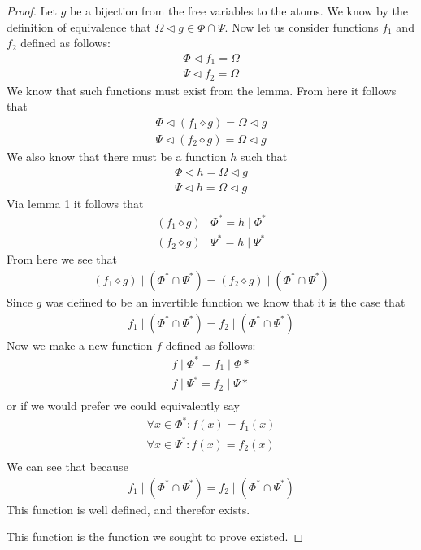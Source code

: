 \documentclass{article}
\begin{document}
\begin{proof}
Let $g$ be a bijection from the free variables to the atoms.
We know by the definition of equivalence that $\Omega \lhd g \in \Phi \cap \Psi$.
Now let us consider functions $f_1$ and $f_2$ defined as follows:
\begin{align*}
\Phi \lhd f_1 = \Omega \\
\Psi \lhd f_2 = \Omega
\end{align*}
We know that such functions must exist from the lemma.
From here it follows that
\begin{align*}
\Phi \lhd (f_1 \diamond g) = \Omega \lhd g \\
\Psi \lhd (f_2 \diamond g) = \Omega \lhd g
\end{align*}
We also know that there must be a function $h$ such that
\begin{align*}
\Phi \lhd h = \Omega \lhd g \\
\Psi \lhd h = \Omega \lhd g
\end{align*}
Via lemma 1 it follows that
\begin{align*}
(f_1 \diamond g) \mid \Phi^* = h \mid \Phi^* \\
(f_2 \diamond g) \mid \Psi^* = h \mid \Psi^*
\end{align*}
From here we see that
\begin{align*}
(f_1 \diamond g) \mid (\Phi^* \cap \Psi^*) = (f_2 \diamond g) \mid (\Phi^* \cap \Psi^*)
\end{align*}
Since $g$ was defined to be an invertible function we know that it is the case that
\begin{align*}
f_1 \mid (\Phi^* \cap \Psi^*) = f_2 \mid (\Phi^* \cap \Psi^*)
\end{align*}
Now we make a new function $f$ defined as follows:
\begin{align*}
f \mid \Phi^* = f_1 \mid \Phi* \\
f \mid \Psi^* = f_2 \mid \Psi* \\
\end{align*}
or if we would prefer we could equivalently say
\begin{align*}
\forall x \in \Phi^* : f (x) = f_1 (x) \\
\forall x \in \Psi^* : f (x) = f_2 (x) \\
\end{align*}
We can see that because
\begin{align*}
f_1 \mid (\Phi^* \cap \Psi^*) = f_2 \mid (\Phi^* \cap \Psi^*)
\end{align*}
This function is well defined, and therefor exists.

This function is the function we sought to prove existed.
\end{proof}
\end{document}

